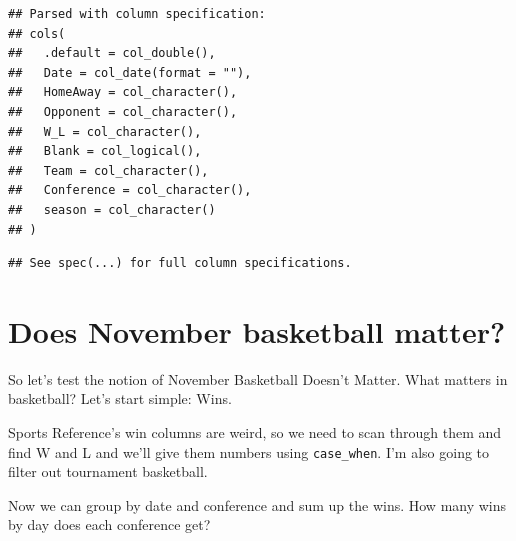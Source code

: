 \documentclass[
]{book}
\newenvironment{Shaded}{\begin{snugshade}}{\end{snugshade}}
\newcommand{\DataTypeTok}[1]{\textcolor[rgb]{0.13,0.29,0.53}{#1}}
\newcommand{\DecValTok}[1]{\textcolor[rgb]{0.00,0.00,0.81}{#1}}
\newcommand{\KeywordTok}[1]{\textcolor[rgb]{0.13,0.29,0.53}{\textbf{#1}}}
\newcommand{\NormalTok}[1]{#1}
\newcommand{\OperatorTok}[1]{\textcolor[rgb]{0.81,0.36,0.00}{\textbf{#1}}}
\newcommand{\StringTok}[1]{\textcolor[rgb]{0.31,0.60,0.02}{#1}}
\begin{document}
\begin{verbatim}
## Parsed with column specification:
## cols(
##   .default = col_double(),
##   Date = col_date(format = ""),
##   HomeAway = col_character(),
##   Opponent = col_character(),
##   W_L = col_character(),
##   Blank = col_logical(),
##   Team = col_character(),
##   Conference = col_character(),
##   season = col_character()
## )
\end{verbatim}

\begin{verbatim}
## See spec(...) for full column specifications.
\end{verbatim}

\hypertarget{does-november-basketball-matter}{%
\section{Does November basketball matter?}\label{does-november-basketball-matter}}

So let's test the notion of November Basketball Doesn't Matter. What matters in basketball? Let's start simple: Wins.

Sports Reference's win columns are weird, so we need to scan through them and find W and L and we'll give them numbers using \texttt{case\_when}. I'm also going to filter out tournament basketball.

\begin{Shaded}
\end{Shaded}

Now we can group by date and conference and sum up the wins. How many wins by day does each conference get?

\begin{Shaded}
\end{Shaded}
\end{document}
